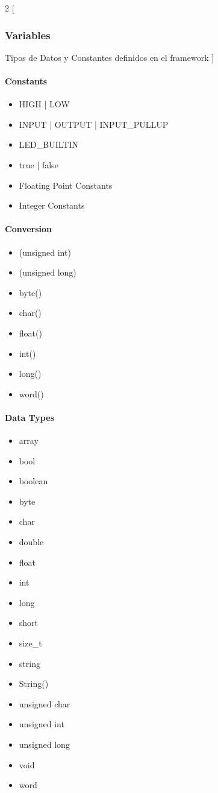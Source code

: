 \documentclass[../informe_krapp.tex]{subfiles}
\begin{document}
\clearpage

\begin{multicols}{2}
	[
		\subsubsection{Variables}
		Tipos de Datos y Constantes definidos en el framework
	]
	\paragraph{Constants}
	\begin{itemize}
		\item HIGH | LOW
		\item INPUT | OUTPUT | INPUT\_PULLUP
		\item LED\_BUILTIN
		\item true | false
		\item Floating Point Constants
		\item Integer Constants
	\end{itemize}

	\paragraph{Conversion}
	\begin{itemize}
		\item (unsigned int)
		\item (unsigned long)
		\item byte()
		\item char()
		\item float()
		\item int()
		\item long()
		\item word()
	\end{itemize}

	\paragraph{Data Types}
	\begin{itemize}
		\item array
		\item bool
		\item boolean
		\item byte
		\item char
		\item double
		\item float
		\item int
		\item long
		\item short
		\item size\_t
		\item string
		\item String()
		\item unsigned char
		\item unsigned int
		\item unsigned long
		\item void
		\item word
	\end{itemize}


\end{multicols}
\end{document}
